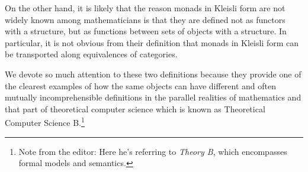 \documentclass[12pt]{amsart}
\numberwithin{proposition}{subsection}
\newcommand{\editorfootnote}[1]{\footnote{Note from the editor: #1}}
\begin{document}
On the other hand, it is likely that the reason monads in Kleisli form are not
widely known among mathematicians is that they are defined not as functors with
a structure, but as functions between sets of objects with a structure. In
particular, it is not obvious from their definition that monads in Kleisli
form can be transported along equivalences of categories.

We devote so much attention to these two definitions because they provide one
of the clearest examples of how the same objects can have different and often
mutually incomprehensible definitions in the parallel realities of mathematics
and that part of theoretical computer science which is known as Theoretical
Computer Science B.\editorfootnote{Here he's referring to {\em Theory B}, which
  encompasses formal models and semantics.}
\end{document}
